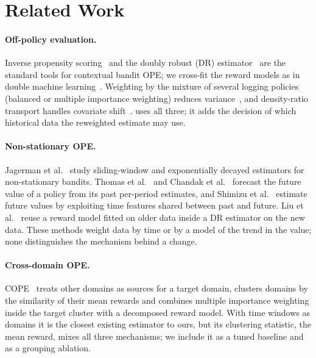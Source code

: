 \section{Related Work}\label{sec:related}

\paragraph{Off-policy evaluation.}
Inverse propensity scoring~\cite{horvitz1952generalization} and the doubly robust (DR)
estimator~\cite{dudik2011doubly} are the standard tools for contextual bandit OPE; we
cross-fit the reward models as in double machine learning~\cite{chernozhukov2018double}.
Weighting by the mixture of several logging policies (balanced or multiple importance
weighting) reduces variance~\cite{agarwal2017effective,kallus2021optimal}, and density-ratio
transport handles covariate shift~\cite{uehara2020offpolicy}. \odrift{} uses all three; it adds
the decision of which historical data the reweighted estimate may use.

\paragraph{Non-stationary OPE.}
Jagerman et al.~\cite{jagerman2019when} study sliding-window and exponentially decayed
estimators for non-stationary bandits. Thomas et al.~\cite{thomas2017predictive} and
Chandak et al.~\cite{chandak2020towards,chandak2022offpolicy} forecast the future value of a policy from
its past per-period estimates, and Shimizu et al.~\cite{shimizu2025offpolicy} estimate
future values by exploiting time features shared between past and future. Liu et
al.~\cite{liu2023asymptotically} reuse a reward model fitted on older data inside a DR
estimator on the new data. These methods weight data by time or by a model of the trend
in the value; none distinguishes the mechanism behind a change.

\paragraph{Cross-domain OPE.}
COPE~\cite{natsubori2025cross} treats other domains as sources for a target domain,
clusters domains by the similarity of their mean rewards and combines multiple importance
weighting inside the target cluster with a decomposed reward model. With time
windows as domains it is the closest existing estimator to ours, but its clustering statistic,
the mean reward, mixes all three mechanisms; we include it as a tuned baseline and as a
grouping ablation.

